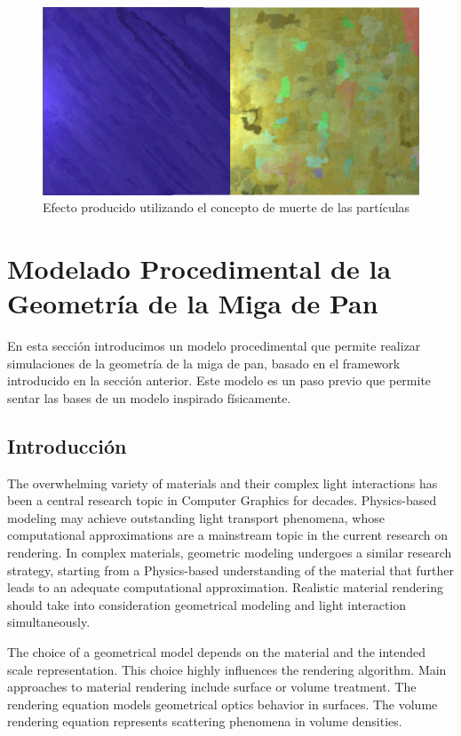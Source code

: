 \documentclass[spanish,a4paper,11pt,oneside,links]{report}
\begin{document}
\begin{figure}[t!]
\centering
\includegraphics[scale=0.2]{muerte}
\caption{Efecto producido utilizando el concepto de muerte de las part\'iculas}
\label{muerte}
\end{figure}



\section{Modelado Procedimental de la Geometría de la Miga de Pan}
En esta sección introducimos un modelo procedimental que permite realizar simulaciones de la geometr\'ia de la miga de pan, basado en el framework introducido en la secci\'on anterior.
Este modelo es un paso previo que permite sentar las bases de un modelo inspirado físicamente.

\subsection{Introducci\'on}
The overwhelming variety of materials and their complex light interactions has been a central research topic in Computer Graphics for decades. 
Physics-based modeling may achieve outstanding light transport phenomena, whose computational approximations are a mainstream topic in the current research on rendering.
In complex materials, geometric modeling undergoes a similar research strategy, starting from a Physics-based understanding of the material that further leads to an adequate computational approximation.
Realistic material rendering should take into consideration geometrical modeling and light interaction simultaneously.

The choice of a geometrical model depends on the material and the intended scale representation.
This choice highly influences the rendering algorithm. Main approaches to material rendering include surface or volume treatment. 
The rendering equation \cite{Kajiya1986} models geometrical optics behavior in surfaces. 
The volume rendering equation \cite{Kajiya1984} represents scattering phenomena in volume densities.
\end{document}
